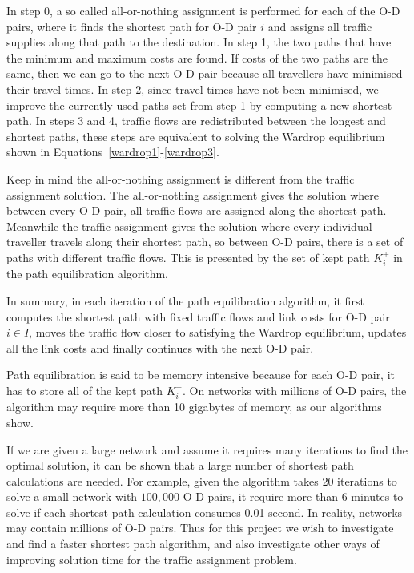 In step 0, a so called all-or-nothing assignment is performed for each of the O-D pairs,
where it finds the shortest path for O-D pair $i$ and assigns all traffic supplies along that path to the destination.
In step 1, the two paths that have the minimum and maximum costs are found.
If costs of the two paths are the same, then we can go to the next O-D pair because all travellers have minimised their travel times.
In step 2, since travel times have not been minimised, we improve the currently used paths set from step 1 by computing a new shortest path.
In steps 3 and 4, traffic flows are redistributed between the longest and shortest paths, these steps are equivalent to solving the Wardrop equilibrium shown in Equations~\eqref{wardrop1}-\eqref{wardrop3}.

Keep in mind the all-or-nothing assignment is different from the traffic assignment solution.
The all-or-nothing assignment gives the solution where between every O-D pair,
all traffic flows are assigned along the shortest path.
Meanwhile the traffic assignment gives the solution where every individual traveller travels along their shortest path,
so between O-D pairs, there is a set of paths with different traffic flows.
This is presented by the set of kept path $K_i^+$ in the path equilibration algorithm.

In summary, in each iteration of the path equilibration algorithm,
it first computes the shortest path with fixed traffic flows and link costs for O-D pair $i \in I$, moves the traffic flow closer to satisfying the Wardrop equilibrium,
updates all the link costs and finally continues with the next O-D pair.

Path equilibration is said to be memory intensive because for each O-D pair, it has to store all of the kept path $K_i^+$.
On networks with millions of O-D pairs, the algorithm may require more than 10 gigabytes of memory, as our algorithms show.

If we are given a large network and assume it requires many iterations to find the optimal solution,
it can be shown that a large number of shortest path calculations are needed.
For example, 
given the algorithm takes 20 iterations to solve a small network with $100,000$ O-D pairs,
it require more than 6 minutes to solve if
each shortest path calculation consumes 0.01 second.
In reality,
networks may contain millions of O-D pairs.
Thus for this project we wish to
investigate and find a faster shortest path algorithm,
and also investigate other ways of improving solution time for the traffic assignment problem.

